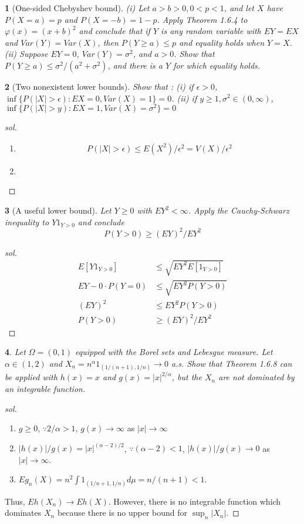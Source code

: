 \documentclass{report}
\newtheorem{ex}{}[section]
\begin{document}
\begin{ex}[One-sided Chebyshev bound]
(i) Let $a > b > 0, 0 < p < 1$, and let $X$ have $P(X = a) = p$ and $P(X = -b) = 1-p$. Apply Theorem 1.6.4 to $\varphi(x) = (x+b)^2$ and conclude that if $Y$ is any random variable with $EY = EX$ and $Var (Y) = Var (X)$, then $P(Y \ge a) \le p$ and equality holds when $Y = X$.
(ii) Suppose $EY = 0$, $Var(Y) = \sigma^2$, and $a > 0$. Show that $P(Y \ge a) \le \sigma^2 /(a^2 + \sigma^2)$, and there is a $Y$ for which equality holds.
\end{ex}
\begin{ex}[Two nonexistent lower bounds]
Show that : (i) if $\epsilon > 0$, $\inf \{P(|X| > \epsilon) : EX = 0, Var(X) = 1\} = 0$. (ii) if $y \ge 1, \sigma^2 \in (0,\infty)$, $\inf \{P(|X| > y) : EX = 1, Var(X) = \sigma^2\} = 0$
\end{ex}
\begin{proof}[sol]
\begin{enumerate}
    \item[(i)]
    \begin{align*}
        P(|X| > \epsilon) \le E(X^2)/\epsilon^2 = V(X)/\epsilon^2
    \end{align*}
    \item[(ii)]
\end{enumerate}
\end{proof}
\begin{ex}[A useful lower bound]
Let $Y \ge 0$ with $EY^2 <\infty$. Apply the Cauchy-Schwarz inequality to $Y 1_{Y >0}$ and conclude
\[P(Y > 0) \ge (EY)^2 / EY^2\]
\end{ex}
\begin{proof}[sol]
\begin{align*}
    E[Y1_{Y > 0}] &\le \sqrt{EY^2E[1_{Y>0}]}\\
    EY - 0\cdot P(Y = 0) &\le \sqrt{EY^2P(Y >0)}\\
    (EY)^2 &\le EY^2P(Y > 0)\\
    P(Y > 0) &\ge (EY)^2 / EY^2
\end{align*}
\end{proof}
\begin{ex}
Let $\Omega = (0,1)$ equipped with the Borel sets and Lebesgue measure. Let $\alpha \in (1,2)$ and $X_n = n^\alpha 1_{(1/(n+1), 1/n)} \to 0$ a.s. Show that Theorem 1.6.8 can be applied with $h(x) = x$ and $g(x) = |x|^{2/\alpha}$, but the $X_n$ are not dominated by an integrable function.
\end{ex}
\begin{proof}[sol]~
\begin{enumerate}
    \item $g \ge 0$, $\because 2/\alpha > 1$, $g(x) \to \infty$ as $|x| \to \infty$
    \item $|h(x)|/g(x) = |x|^{(\alpha -2)/2}$, $\because (\alpha - 2) < 1$, $|h(x)|/g(x) \to 0$ as $|x| \to \infty$.
    \item $Eg_n(X) = n^2\int 1_{(1/n+1, 1/n)}d\mu  = n/(n+1) < 1$.
\end{enumerate}
Thus, $Eh(X_n) \to Eh(X)$. However, there is no integrable function which dominates $X_n$ because there is no upper bound for $\sup_n |X_n|$.
\end{proof}
\end{document}
